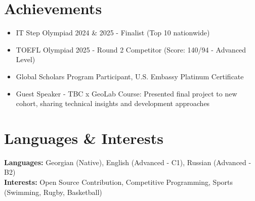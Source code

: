 \documentclass{article}
\begin{document}
\section{Achievements}
\begin{itemize}[leftmargin=*, itemsep=0pt]
\item IT Step Olympiad 2024 \& 2025 - Finalist (Top 10 nationwide)
\item TOEFL Olympiad 2025 - Round 2 Competitor (Score: 140/94 - Advanced Level)
\item Global Scholars Program Participant, U.S. Embassy Platinum Certificate
\item Guest Speaker - TBC x GeoLab Course: Presented final project to new cohort, sharing technical insights and development approaches
\end{itemize}

\section{Languages \& Interests}
\textbf{Languages:} Georgian (Native), English (Advanced - C1), Russian (Advanced - B2) \\
\textbf{Interests:} Open Source Contribution, Competitive Programming, Sports (Swimming, Rugby, Basketball)
\end{document}
